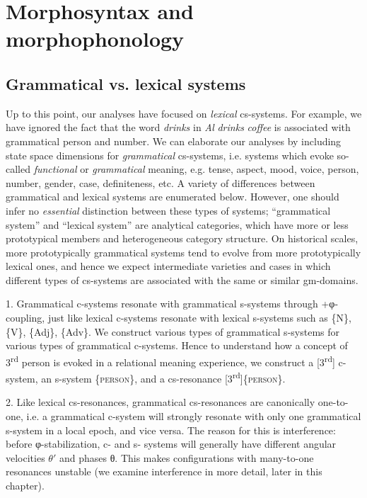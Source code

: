 \section{Morphosyntax and morphophonology}
\subsection{Grammatical vs. lexical systems}

Up to this point, our analyses have focused on \textit{lexical} cs-systems. For example, we have ignored the fact that the word \textit{drinks} in \textit{Al} \textit{drinks} \textit{coffee} is associated with grammatical person and number. We can elaborate our analyses by including state space dimensions for \textit{grammatical} cs-systems, i.e. systems which evoke so-called \textit{functional} or \textit{grammatical} meaning, e.g. tense, aspect, mood, voice, person, number, gender, case, definiteness, etc. A variety of differences between grammatical and lexical systems are enumerated below. However, one should infer no \textit{essential} distinction between these types of systems; “grammatical system” and “lexical system” are analytical categories, which have more or less prototypical members and heterogeneous category structure. On historical scales, more prototypically grammatical systems tend to evolve from more prototypically lexical ones, and hence we expect intermediate varieties and cases in which different types of cs-systems are associated with the same or similar gm-domains. 

1. Grammatical c-systems resonate with grammatical s-systems through +φ-coupling, just like lexical c-systems resonate with lexical s-systems such as \{N\}, \{V\}, \{Adj\}, \{Adv\}. We construct various types of grammatical s-systems for various types of grammatical c-systems. Hence to understand how a concept of 3\textsuperscript{rd} person is evoked in a relational meaning experience, we construct a [3\textsuperscript{rd}] c-system, an s-system \{\textsc{person}\}, and a cs-resonance [3\textsuperscript{rd}]\{\textsc{person}\}. 

2. Like lexical cs-resonances, grammatical cs-resonances are canonically one-to-one, i.e. a grammatical c-system will strongly resonate with only one grammatical s-system in a local epoch, and vice versa. The reason for this is interference: before φ-stabilization, c- and s- systems will generally have different angular velocities $\theta ′$ and phases θ. This makes configurations with many-to-one resonances unstable (we examine interference in more detail, later in this chapter).

